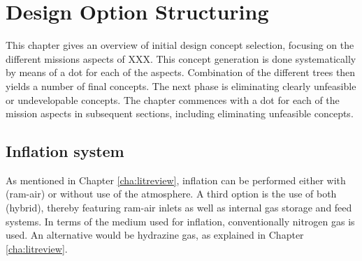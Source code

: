 \section{Design Option Structuring} \label{ch:design}
This chapter gives an overview of initial design concept selection, focusing on the different missions aspects of XXX. This concept generation is done systematically by means of a \gls{dot} for each of the aspects. Combination of the different trees then yields a number of final concepts. The next phase is eliminating clearly unfeasible or undevelopable concepts. The chapter commences with a \gls{dot} for each of the mission aspects in subsequent sections, including eliminating unfeasible concepts.

\subsection{Inflation system}
As mentioned in Chapter \ref{cha:litreview}, inflation can be performed either with (ram-air) or without use of the atmosphere. A third option is the use of both (hybrid), thereby featuring ram-air inlets as well as internal gas storage and feed systems. In terms of the medium used for inflation, conventionally nitrogen gas is used. An alternative would be hydrazine gas, as explained in Chapter \ref{cha:litreview}.


